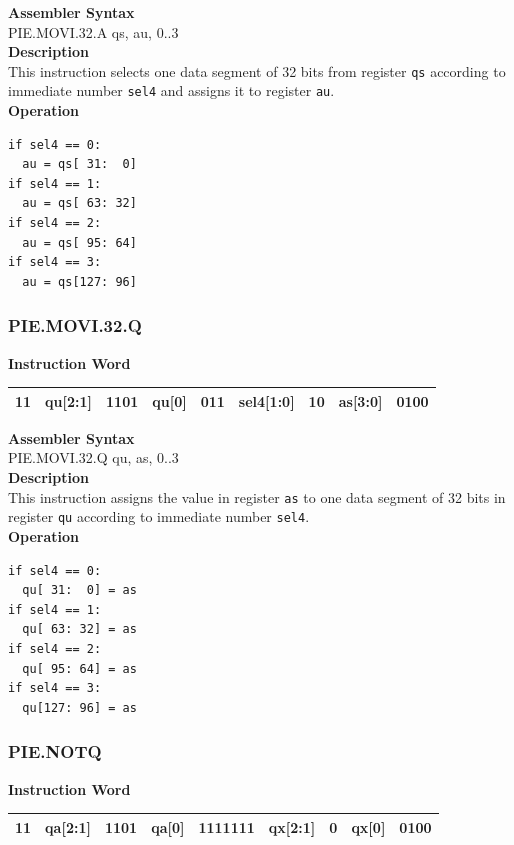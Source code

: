 \textbf{Assembler Syntax} \\
PIE.MOVI.32.A qs, au, 0..3 \\
\textbf{Description} \\
This instruction selects one data segment of 32 bits from register \lstinline{qs} according to immediate number \lstinline{sel4} and assigns it to register \lstinline{au}.\\
\textbf{Operation}
\begin{lstlisting}
if sel4 == 0:
  au = qs[ 31:  0]
if sel4 == 1:
  au = qs[ 63: 32]
if sel4 == 2:
  au = qs[ 95: 64]
if sel4 == 3:
  au = qs[127: 96]
\end{lstlisting}

\newpage
\subsubsection{PIE.MOVI.32.Q}\label{instruction:PIEMOVI32Q}
\setlength\tabcolsep{6pt}
\textbf{Instruction Word} \\
\begin{tabular}{|c|c|c|c|c|c|c|c|c|}
	\hline
	11 & qu[2:1] & 1101 & qu[0] & 011 & sel4[1:0] & 10 & as[3:0] & 0100 \\
	\hline
\end{tabular}

\textbf{Assembler Syntax} \\
PIE.MOVI.32.Q qu, as, 0..3 \\
\textbf{Description} \\
This instruction assigns the value in register \lstinline{as} to one data segment of 32 bits in register \lstinline{qu} according to immediate number \lstinline{sel4}.\\
\textbf{Operation}
\begin{lstlisting}
if sel4 == 0:
  qu[ 31:  0] = as
if sel4 == 1:
  qu[ 63: 32] = as
if sel4 == 2:
  qu[ 95: 64] = as
if sel4 == 3:
  qu[127: 96] = as
\end{lstlisting}

\newpage
\subsubsection{PIE.NOTQ}\label{instruction:PIENOTQ}
\setlength\tabcolsep{6pt}
\textbf{Instruction Word} \\
\begin{tabular}{|c|c|c|c|c|c|c|c|c|}
	\hline
	11 & qa[2:1] & 1101 & qa[0] & 1111111 & qx[2:1] & 0 & qx[0] & 0100 \\
	\hline
\end{tabular}

